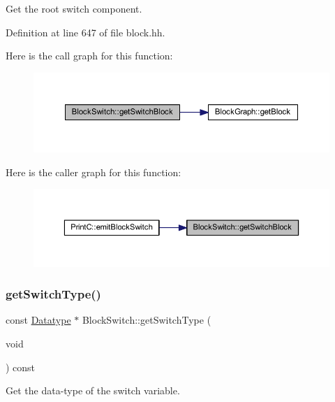Get the root switch component. 



Definition at line 647 of file block.\+hh.

Here is the call graph for this function\+:
\nopagebreak
\begin{figure}[H]
\begin{center}
\leavevmode
\includegraphics[width=350pt]{class_block_switch_aa1e2e28b18779bc98c41ec5925d29baf_cgraph}
\end{center}
\end{figure}
Here is the caller graph for this function\+:
\nopagebreak
\begin{figure}[H]
\begin{center}
\leavevmode
\includegraphics[width=350pt]{class_block_switch_aa1e2e28b18779bc98c41ec5925d29baf_icgraph}
\end{center}
\end{figure}
\mbox{\label{class_block_switch_a1f9c2081ef18f91022fd21ff2770fa67}} 
\subsubsection{\texorpdfstring{getSwitchType()}{getSwitchType()}}
{\footnotesize\ttfamily const \mbox{\hyperlink{class_datatype}{Datatype}} $\ast$ Block\+Switch\+::get\+Switch\+Type (\begin{DoxyParamCaption}\item[{void}]{ }\end{DoxyParamCaption}) const}



Get the data-\/type of the switch variable. 

